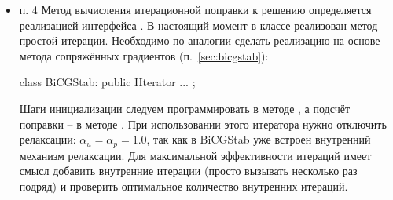 \begin{itemize}
Сначала матрица левой части собирается в глобальную,
потом вызывается решатель, для нахождения неизвестного вектора $x$ в левой части.
Полученная матрица имеет проблему седловой точки (нули на диагоналях),
поэтому её нельзя решить общими итерационными методами.
Для её решения исплользуется точный решатель .
Предлагается решать эту систему с следующем порядке
\begin{equation*}
\left(
\begin{matrix}
A & 0 \\
B & -S
\end{matrix}
\right)
\left(
\begin{matrix}
y_u\\
y_p
\end{matrix}
\right) = 
\left(
\begin{matrix}
r_u\\
r_p
\end{matrix}
\right)
\end{equation*}
откуда
\begin{align*}
&y_u = A^{-1} r_u,\\
&y_p = S^{-1} (B y_u - r_p).
\end{align*}
Далее
\begin{equation*}
\left(
\begin{matrix}
I & HB^T \\
0 & I
\end{matrix}
\right)
\left(
\begin{matrix}
x_u\\
x_p
\end{matrix}
\right) = 
\left(
\begin{matrix}
y_u\\
y_p
\end{matrix}
\right)
\end{equation*}
откуда
\begin{align*}
&x_p = y_p, \\
&x_u = y_u - H B^T x_p
\end{align*}
Для вычисления $y$ воспользоваться матричным решателем.
Сначала точным (),
потом, если всё работает, можно перейти на итерационный
() и сравнить время работы.

\item п. 4
Метод вычисления итерационной поправки к решению определяется реализацией
интерфейса .
В настоящий момент в классе  реализован метод простой итерации.
Необходимо по аналогии сделать реализацию на основе метода сопряжённых градиентов (п.~\ref{sec:bicgstab}):
\begin{cppcode}
class BiCGStab: public IIterator { ... };
\end{cppcode}
Шаги инициализации следуем программировать в методе , а подсчёт
поправки -- в методе .
При использовании этого итератора нужно
отключить релаксации: $\alpha_u = \alpha_p = 1.0$,
так как в BiCGStab уже встроен внутренний механизм релаксации.
Для максимальной эффективности итераций имеет смысл добавить внутренние
итерации (просто вызывать  несколько раз подряд) и проверить оптимальное количество внутренних итераций.


\end{itemize}
